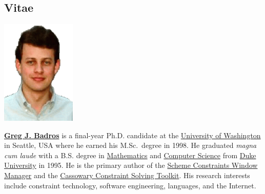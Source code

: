 \documentclass{article}
\begin{document}
\begin{multicols}{2}
\section*{Vitae}
\begin{floatingfigure}[l]{1.2in}
\hspace*{-.8cm}
\includegraphics[width=1.4in]{gjb-face.eps}
\end{floatingfigure}

\textbf{\href{http://www.cs.washington.edu/homes/gjb}{Greg J. Badros}}
is a final-year Ph.D. candidate at the
\href{http://www.cs.washington.edu}{University of Washington} 
in Seattle, USA where he earned his M.Sc.\  degree in 1998.  
He graduated \textit{magna cum laude} with a B.S.
degree in \href{http://www.math.duke.edu}{Mathematics} and 
\href{http://www.cs.duke.edu}{Computer Science} from
\href{http://www.duke.edu}{Duke University} in 1995.  He is the 
primary author of the 
\href{http://scwm.mit.edu}{Scheme Constraints Window Manager} and the 
\href{http://www.cs.washington.edu/research/constraints/cassowary}{Cassowary
Constraint Solving Toolkit}.  His research interests include
constraint technology, software engineering, languages, and the
Internet.

\end{multicols}
\end{document}

